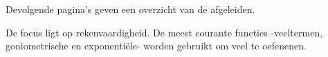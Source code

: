 \documentclass{ximera}
\begin{document}
	\author{Wiskundeplan}


Devolgende pagina's geven een overzicht van de afgeleiden. 

De focus ligt op rekenvaardigheid. De meest courante functies -veeltermen, goniometrische en exponentiële- worden gebruikt om veel te oefenenen. 
\end{document}
